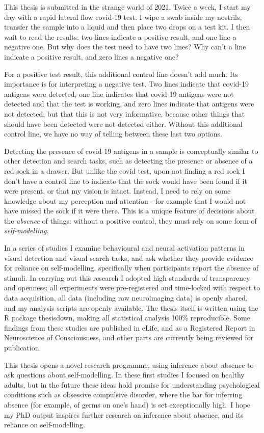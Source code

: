 \documentclass[12pt,twoside]{reedthesis}
\begin{document}
  \begin{impact}
    This thesis is submitted in the strange world of 2021. Twice a week, I start my day with a rapid lateral flow covid-19 test. I wipe a swab inside my nostrils, transfer the sample into a liquid and then place two drops on a test kit. I then wait to read the results: two lines indicate a positive result, and one line a negative one. But why does the test need to have two lines? Why can't a line indicate a positive result, and zero lines a negative one?

    For a positive test result, this additional control line doesn't add much. Its importance is for interpreting a negative test. Two lines indicate that covid-19 antigens were detected, one line indicates that covid-19 antigens were not detected and that the test is working, and zero lines indicate that antigens were not detected, but that this is not very informative, because other things that should have been detected were not detected either. Without this additional control line, we have no way of telling between these last two options.

    Detecting the presence of covid-19 antigens in a sample is conceptually similar to other detection and search tasks, such as detecting the presence or absence of a red sock in a drawer. But unlike the covid test, upon not finding a red sock I don't have a control line to indicate that the sock would have been found if it were present, or that my vision is intact. Instead, I need to rely on some knowledge about my perception and attention - for example that I would not have missed the sock if it were there. This is a unique feature of decisions about the \emph{absence} of things: without a positive control, they must rely on some form of \emph{self-modelling}.

    In a series of studies I examine behavioural and neural activation patterns in visual detection and visual search tasks, and ask whether they provide evidence for reliance on self-modelling, specifically when participants report the absence of stimuli. In carrying out this research I adopted high standards of transparency and openness: all experiments were pre-registered and time-locked with respect to data acquisition, all data (including raw neuroimaging data) is openly shared, and my analysis scripts are openly available. The thesis itself is written using the R package thesisdown, making all statistical analysis 100\% reproducible. Some findings from these studies are published in eLife, and as a Registered Report in Neuroscience of Consciousness, and other parts are currently being reviewed for publication.

    This thesis opens a novel research programme, using inference about absence to ask questions about self-modelling. In these first studies I focused on healthy adults, but in the future these ideas hold promise for understanding psychological conditions such as obsessive compulsive disorder, where the bar for inferring absence (for example, of germs on one's hand) is set exceptionally high. I hope my PhD output inspires further research on inference about absence, and its reliance on self-modelling.
  \end{impact}
\end{document}
